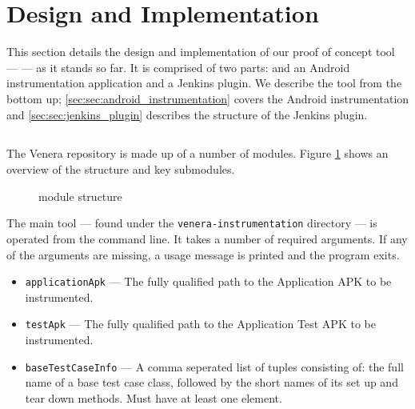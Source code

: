 \section{Design and Implementation}
\label{sec:imp}

This section details the design and implementation of our proof of concept tool
--- \venera --- as it stands so far. It is comprised of two parts: and an
Android instrumentation application and a Jenkins plugin.
We describe the tool from the bottom up;
\autoref{sec:sec:android_instrumentation} covers the Android instrumentation and
\autoref{sec:sec:jenkins_plugin} describes the structure of the Jenkins plugin.

\subsection{\venera}
\label{sec:sec:android_instrumentation}

The Venera repository\cite{heisentestInstrumentation} is made up of a number of
modules. Figure \ref{fig:repo_structure} shows an overview of the structure and
key submodules.

\begin{figure}[h]
\caption{\venera module structure}
\label{fig:repo_structure}
\end{figure}

The main tool --- found under the {\tt venera-instrumentation} directory --- is
operated from the command line. It takes a number of required arguments. If any
of the arguments are missing, a usage message is printed and the program exits.

\begin{itemize}
    \item {\tt applicationApk} --- The fully qualified path to the Application
    APK to be instrumented.
    \item {\tt testApk} --- The fully qualified path to the Application Test APK
    to be instrumented.
    \item {\tt baseTestCaseInfo} --- A comma seperated list of tuples consisting
    of: the full name of a base test case class, followed by the short names of
    its set up and tear down methods. Must have at least one element.
\end{itemize}

